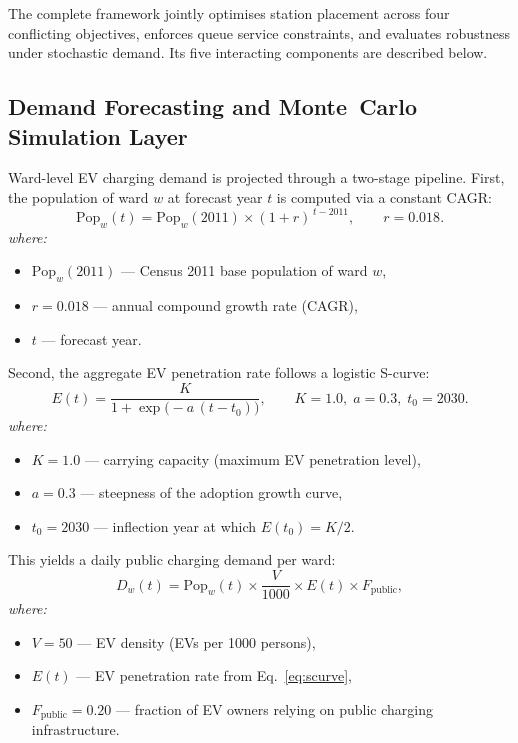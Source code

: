 \noindent
The complete framework jointly optimises station placement across four
conflicting objectives, enforces queue service constraints, and evaluates
robustness under stochastic demand. Its five interacting components are
described below.

\subsection{Demand Forecasting and Monte~Carlo Simulation Layer}
\label{sec:demand_layer}

Ward-level EV charging demand is projected through a two-stage pipeline.
First, the population of ward $w$ at forecast year $t$ is computed via a
constant CAGR:
\begin{equation}
\mathrm{Pop}_w(t)
= \mathrm{Pop}_w(2011)\times(1 + r)^{\,t-2011},
\qquad r = 0.018.
\label{eq:cagr}
\end{equation}
\textit{where:}
\begin{itemize}
  \item $\mathrm{Pop}_w(2011)$ — Census 2011 base population of ward $w$,
  \item $r = 0.018$ — annual compound growth rate (CAGR),
  \item $t$ — forecast year.
\end{itemize}

\medskip\noindent
Second, the aggregate EV penetration rate follows a logistic S-curve:
\begin{equation}
E(t) = \frac{K}{1 + \exp\!\bigl(-a\,(t - t_0)\bigr)},
\qquad K=1.0,\; a=0.3,\; t_0=2030.
\label{eq:scurve}
\end{equation}
\textit{where:}
\begin{itemize}
  \item $K = 1.0$ — carrying capacity (maximum EV penetration level),
  \item $a = 0.3$ — steepness of the adoption growth curve,
  \item $t_0 = 2030$ — inflection year at which $E(t_0) = K/2$.
\end{itemize}

\medskip\noindent
This yields a daily public charging demand per ward:
\begin{equation}
D_w(t)
= \mathrm{Pop}_w(t)
  \times \frac{V}{1000}
  \times E(t)
  \times F_{\mathrm{public}},
\label{eq:demand}
\end{equation}
\textit{where:}
\begin{itemize}
  \item $V = 50$ — EV density (EVs per 1000 persons),
  \item $E(t)$ — EV penetration rate from Eq.~\eqref{eq:scurve},
  \item $F_{\mathrm{public}} = 0.20$ — fraction of EV owners relying on
        public charging infrastructure.
\end{itemize}

